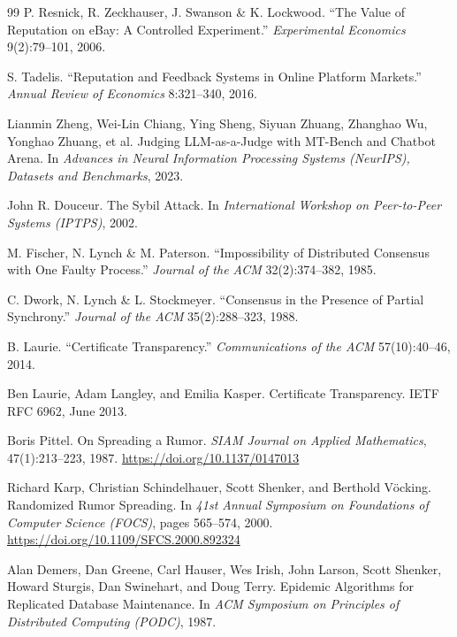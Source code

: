 \documentclass[11pt,a4paper]{article}
\theoremstyle{definition}
\theoremstyle{definition}
\theoremstyle{remark}
\begin{document}
\begin{thebibliography}{99}
 P. Resnick, R. Zeckhauser, J. Swanson \& K. Lockwood. ``The
Value of Reputation on eBay: A Controlled Experiment.'' \emph{Experimental
Economics} 9(2):79--101, 2006.

 S. Tadelis. ``Reputation and Feedback Systems in Online
Platform Markets.'' \emph{Annual Review of Economics} 8:321--340, 2016.

Lianmin Zheng, Wei-Lin Chiang, Ying Sheng, Siyuan Zhuang, Zhanghao Wu, Yonghao Zhuang, et al.
\newblock Judging LLM-as-a-Judge with MT-Bench and Chatbot Arena.
\newblock In \textit{Advances in Neural Information Processing Systems (NeurIPS), Datasets and Benchmarks}, 2023.

 John R. Douceur.
\newblock The Sybil Attack.
\newblock In \textit{International Workshop on Peer-to-Peer Systems (IPTPS)}, 2002.

 M. Fischer, N. Lynch \& M. Paterson. ``Impossibility of
Distributed Consensus with One Faulty Process.'' \emph{Journal of the ACM}
32(2):374--382, 1985.

 C. Dwork, N. Lynch \& L. Stockmeyer. ``Consensus in the Presence
of Partial Synchrony.'' \emph{Journal of the ACM} 35(2):288--323, 1988.

 B. Laurie. ``Certificate Transparency.'' \emph{Communications
of the ACM} 57(10):40--46, 2014.

Ben Laurie, Adam Langley, and Emilia Kasper.
\newblock Certificate Transparency.
\newblock IETF RFC 6962, June 2013.

Boris Pittel.
\newblock On Spreading a Rumor.
\newblock \textit{SIAM Journal on Applied Mathematics}, 47(1):213--223, 1987.
\newblock \url{https://doi.org/10.1137/0147013}

Richard Karp, Christian Schindelhauer, Scott Shenker, and Berthold V\"ocking.
\newblock Randomized Rumor Spreading.
\newblock In \textit{41st Annual Symposium on Foundations of Computer Science (FOCS)}, pages 565--574, 2000.
\newblock \url{https://doi.org/10.1109/SFCS.2000.892324}

Alan Demers, Dan Greene, Carl Hauser, Wes Irish, John Larson, Scott Shenker, Howard Sturgis, Dan Swinehart, and Doug Terry.
\newblock Epidemic Algorithms for Replicated Database Maintenance.
\newblock In \textit{ACM Symposium on Principles of Distributed Computing (PODC)}, 1987.


\end{thebibliography}
\end{document}

